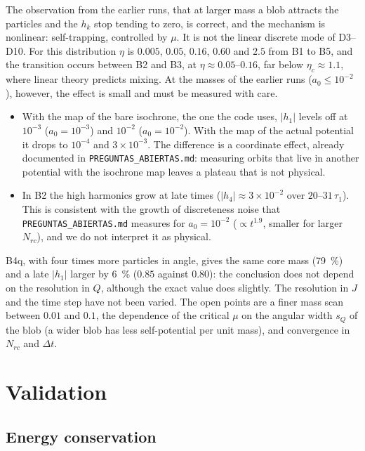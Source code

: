 \documentclass[11pt,a4paper]{article}
\begin{document}
The observation from the earlier runs, that at larger mass a blob attracts the particles
and the $h_k$ stop tending to zero, is correct, and the mechanism is nonlinear:
self-trapping, controlled by $\mu$. It is not the linear discrete mode of D3--D10. For this
distribution $\eta$ is $0.005$, $0.05$, $0.16$, $0.60$ and $2.5$ from B1 to B5, and the
transition occurs between B2 and B3, at $\eta\approx0.05$--$0.16$, far below
$\eta_c\approx1.1$, where linear theory predicts mixing. At the masses of the earlier runs
($a_0\le10^{-2}$), however, the effect is small and must be measured with care.
\begin{itemize}
\item With the map of the bare isochrone, the one the code uses, $|h_1|$ levels off at
$10^{-3}$ ($a_0=10^{-3}$) and $10^{-2}$ ($a_0=10^{-2}$). With the map of the actual potential
it drops to $10^{-4}$ and $3\times10^{-3}$. The difference is a coordinate effect, already
documented in \texttt{PREGUNTAS\_ABIERTAS.md}: measuring orbits that live in another
potential with the isochrone map leaves a plateau that is not physical.
\item In B2 the high harmonics grow at late times ($|h_4|\approx3\times10^{-2}$ over
$20$--$31\,\tau_1$). This is consistent with the growth of discreteness noise that
\texttt{PREGUNTAS\_ABIERTAS.md} measures for $a_0=10^{-2}$ ($\propto t^{1.9}$, smaller for
larger $N_{rc}$), and we do not interpret it as physical.
\end{itemize}

B4q, with four times more particles in angle, gives the same core mass (\SI{79}{\%}) and a
late $|h_1|$ larger by \SI{6}{\%} ($0.85$ against $0.80$): the conclusion does not depend on
the resolution in $Q$, although the exact value does slightly. The resolution in $J$ and
the time step have not been varied. The open points are a finer mass scan between $0.01$
and $0.1$, the dependence of the critical $\mu$ on the angular width $s_Q$ of the blob (a
wider blob has less self-potential per unit mass), and convergence in $N_{rc}$ and
$\Delta t$.

\section{Validation}
\label{sec:controles}

\subsection{Energy conservation}
\label{sec:energia}
\end{document}
